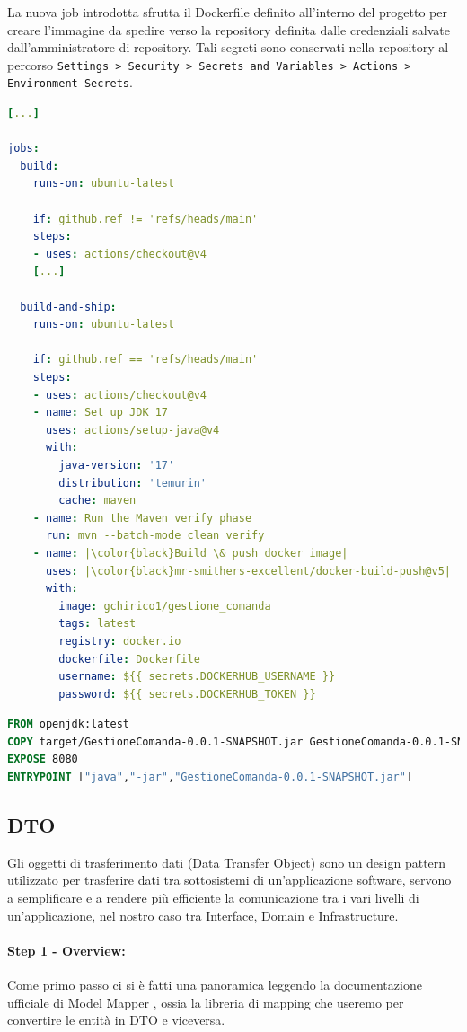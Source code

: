 La nuova job introdotta sfrutta il Dockerfile definito all'interno del progetto per creare l'immagine da spedire verso la repository definita dalle credenziali salvate dall'amministratore di repository. Tali segreti sono conservati nella repository al percorso \texttt{Settings > Security > Secrets and Variables > Actions > Environment Secrets}.
\begin{lstlisting}[language=yaml, caption={modifiche file maven.yml per CI/CD}, label=lst:maven-yml-CICD]
[...]
    
jobs:
  build:
    runs-on: ubuntu-latest
        
    if: github.ref != 'refs/heads/main'
    steps:
    - uses: actions/checkout@v4
    [...]

  build-and-ship:
    runs-on: ubuntu-latest
      
    if: github.ref == 'refs/heads/main'
    steps:
    - uses: actions/checkout@v4
    - name: Set up JDK 17
      uses: actions/setup-java@v4
      with:
        java-version: '17'
        distribution: 'temurin'
        cache: maven
    - name: Run the Maven verify phase
      run: mvn --batch-mode clean verify
    - name: |\color{black}Build \& push docker image|
      uses: |\color{black}mr-smithers-excellent/docker-build-push@v5|
      with:
        image: gchirico1/gestione_comanda
        tags: latest
        registry: docker.io
        dockerfile: Dockerfile
        username: ${{ secrets.DOCKERHUB_USERNAME }}
        password: ${{ secrets.DOCKERHUB_TOKEN }}
\end{lstlisting}

\begin{lstlisting}[language=Dockerfile , caption={Dockerfile di GestioneComanda}, label=lst:dockerfile]
FROM openjdk:latest
COPY target/GestioneComanda-0.0.1-SNAPSHOT.jar GestioneComanda-0.0.1-SNAPSHOT.jar
EXPOSE 8080
ENTRYPOINT ["java","-jar","GestioneComanda-0.0.1-SNAPSHOT.jar"]
\end{lstlisting}

\subsection{DTO}
Gli oggetti di trasferimento dati (Data Transfer Object) sono un design pattern utilizzato per trasferire dati tra sottosistemi di un’applicazione software, servono a semplificare e a rendere più efficiente la comunicazione tra i vari livelli di un'applicazione, nel nostro caso tra Interface, Domain e Infrastructure.
\paragraph{Step 1 - Overview:}
Come primo passo ci si è fatti una panoramica leggendo la documentazione ufficiale di Model Mapper \cite{ModelMapperGettingStarted}, ossia la libreria di mapping che useremo per convertire le entità in DTO e viceversa.
